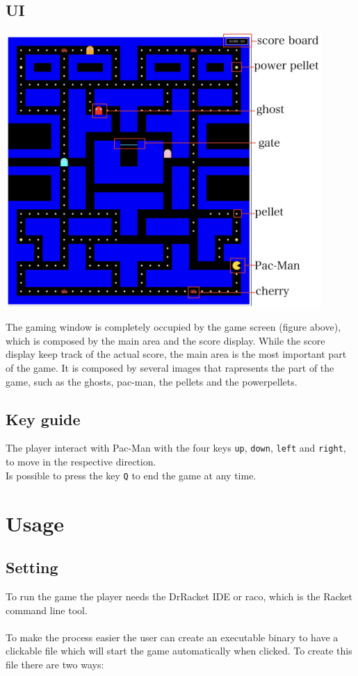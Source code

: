 \documentclass{article}
\begin{document}
  \subsection{UI}
\begin{center}
\includegraphics[width=12cm]{./images/user_interface.png}
\end{center}
The gaming window is completely occupied by the game screen (figure above), which is composed by the main area and the score display. While the score display keep track of the actual score, the main area is the most important part of the game. It is composed by several images that rapresents the part of the game, such as the ghosts, pac-man, the pellets and the powerpellets.
 
\subsection{Key guide}
The player interact with Pac-Man with the four keys \texttt{up}, \texttt{down}, \texttt{left} and \texttt{right}, to move in the respective direction.
\\
Is possible to press the key \texttt{Q} to end the game at any time.

 
  \section{Usage}
  
  \subsection{Setting}\label{setting}
To run the game the player needs the DrRacket IDE or raco, which is the Racket command line tool.\\
\\
To make the process easier the user can create an executable binary to have a clickable file which will start the game automatically when clicked. To create this file there are two ways:
\end{document}
